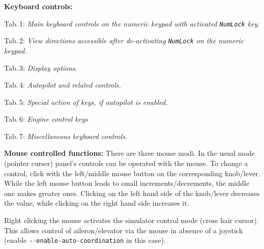 \documentclass[10pt]{article}
\begin{document}
 \noindent
 \textbf{Keyboard controls:}
\begin{multicols}{2}
 \noindent
 Tab.\,1: \textit{Main keyboard controls on the numeric keypad with
 activated \texttt{NumLock} key}.\\

\noindent

\bigskip

 \noindent
 Tab.\,2: \textit{View directions accessible after de-activating \texttt{NumLock} on the numeric keypad.}
\medskip

 \noindent
 
\bigskip

 \noindent
 Tab.\,3: \textit{Display options.}
\medskip

 \noindent

\bigskip
\rule{0mm}{15mm}

 \noindent
 Tab.\,4: \textit{Autopilot and related controls.}
\medskip

\noindent

\medskip

 \noindent
Tab.\,5: \textit{Special action of keys, if autopilot is enabled.}
\medskip

 \noindent

\medskip


 \noindent
Tab.\,6: \textit{Engine control keys}
\medskip

 \noindent

\medskip

 \noindent
Tab.\,7: \textit{Miscellaneous keyboard controls.}
\medskip

 \noindent

\medskip


\end{multicols}

 \noindent
 \textbf{Mouse controlled functions:}
 There are three mouse modi. In the usual mode (pointer curser) panel's controls can be operated
 with the mouse. To change a control, click with the left/middle mouse button on the
 corresponding knob/lever. While the left mouse button leads to small increments/decrements,
 the middle one makes greater ones. Clicking on the left hand side of the knob/lever
 decreases the value, while clicking on the right hand side increases it.

 \noindent
 Right clicking the mouse activates the simulator control mode (cross hair cursor). This allows
 control of aileron/elevator via the mouse in absence of a joystick
 (enable \texttt{-$ $-enable-auto-coordination} in this case).
\end{document}
